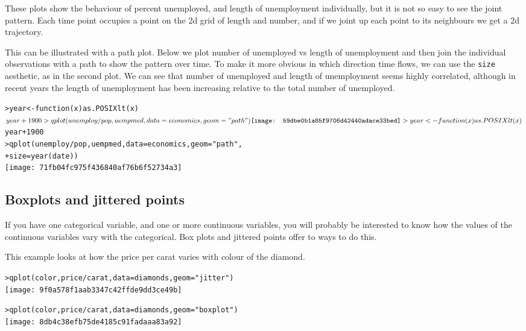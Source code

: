 These plots show the behaviour of percent unemployed, and length of unemployment individually, but it is not so easy to see the joint pattern.  Each time point occupies a point on the 2d grid of length and number, and if we joint up each point to its neighbours we get a 2d trajectory.

This can be illustrated with a path plot.  Below we plot number of unemployed vs length of unemployment and then join the individual observations with a path to show the pattern over time.  To make it more obvious in which direction time flows, we can use the {\tt size} aesthetic, as in the second plot.  We can see that number of unemployed and length of unemployment seems highly correlated, although in recent years the length of unemployment has been increasing relative to the total number of unemployed.

\begin{alltt}
> year <- function(x) as.POSIXlt(x)$year + 1900
> qplot(unemploy/pop, uempmed, data = economics, geom = "path")
\texttt{[image: 59dbe0b1a85f9706d42440adace33bed]}

> year <- function(x) as.POSIXlt(x)$year + 1900
> qplot(unemploy/pop, uempmed, data = economics, geom = "path", 
+     size = year(date))
\texttt{[image: 71fb04fc975f436840af76b6f52734a3]}

\end{alltt}

\subsection{Boxplots and jittered points}\label{sub:boxplot}

If you have one categorical variable, and one or more continuous variables, you will probably be interested to know how the values of the continuous variables vary with the categorical.  Box plots and jittered points offer to ways to do this.  

This example looks at how the price per carat varies with colour of the diamond.

\begin{alltt}
> qplot(color, price/carat, data = diamonds, geom = "jitter")
\texttt{[image: 9f0a578f1aab3347c42ffde9dd3ce49b]}

> qplot(color, price/carat, data = diamonds, geom = "boxplot")
\texttt{[image: 8db4c38efb75de4185c91fadaaa83a92]}

\end{alltt}

